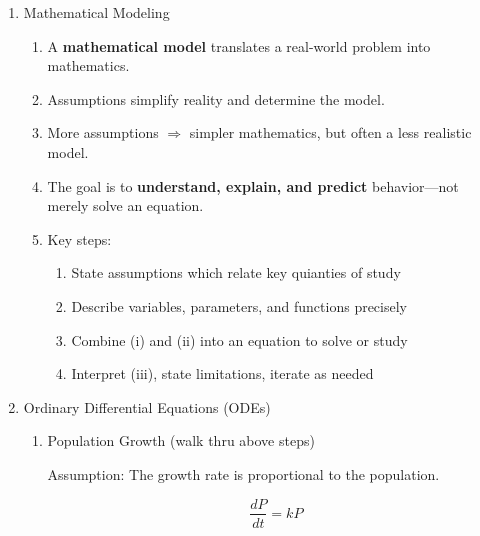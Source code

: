 \documentclass{article}
\begin{document}
\begin{enumerate}

\item Mathematical Modeling
\begin{enumerate}
\item A \textbf{mathematical model} translates a real-world problem into mathematics.
\item Assumptions simplify reality and determine the model.
\item More assumptions $\Rightarrow$ simpler mathematics, but often a less realistic model.
\item The goal is to \textbf{understand, explain, and predict} behavior—not merely solve an equation.
\item Key steps:
\begin{enumerate}
\item State assumptions which relate key quianties of study
\item Describe variables, parameters, and functions precisely
\item Combine (i) and (ii) into an equation to solve or study
\item Interpret (iii), state limitations, iterate as needed
\end{enumerate}
\end{enumerate}

\item Ordinary Differential Equations (ODEs)
\begin{enumerate}

\item Population Growth (walk thru above steps)

Assumption: The growth rate is proportional to the population.

\[
\frac{dP}{dt}=kP
\]


\end{enumerate}
\end{enumerate}
\end{document}
